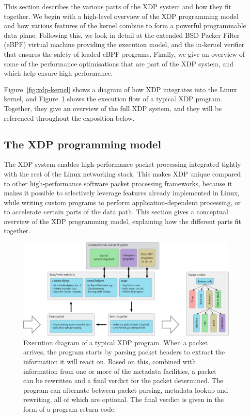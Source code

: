 \documentclass[10pt,sigconf]{acmart}
\begin{document}
This section describes the various parts of the XDP system and how they fit
together. We begin with a high-level overview of the XDP programming model and
how various features of the kernel combine to form a powerful programmable data
plane. Following this, we look in detail at the extended BSD Packer Filter
(eBPF) virtual machine providing the execution model, and the in-kernel verifier
that ensures the safety of loaded eBPF programs. Finally, we give an overview of
some of the performance optimisations that are part of the XDP system, and which
help ensure high performance.

Figure~\ref{fig:xdp-kernel} shows a diagram of how XDP integrates into the Linux
kernel, and Figure~\ref{fig:xdp-execution} shows the execution flow of a typical
XDP program. Together, they give an overview of the full XDP system, and they
will be referenced throughout the exposition below.

\subsection{The XDP programming model}
\label{sec:prog-model}
The XDP system enables high-performance packet processing integrated tightly
with the rest of the Linux networking stack. This makes XDP unique compared to
other high-performance software packet processing frameworks, because it makes
it possible to selectively leverage features already implemented in Linux, while
writing custom programs to perform application-dependent processing, or to
accelerate certain parts of the data path. This section gives a conceptual
overview of the XDP programming model, explaining how the different parts fit
together.

\begin{figure}[t]
\centering
\includegraphics[width=\linewidth]{figures/xdp-execution-diagram.pdf}
\caption{\label{fig:xdp-execution} Execution diagram of a typical XDP program.
  When a packet arrives, the program starts by parsing packet headers to extract
  the information it will react on. Based on this, combined with information
  from one or more of the metadata facilities, a packet can be rewritten and a
  final verdict for the packet determined. The program can alternate between
  packet parsing, metadata lookup and rewriting, all of which are optional. The
  final verdict is given in the form of a program return code.}
\end{figure}
\end{document}
